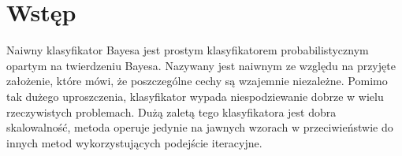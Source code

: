 \section{Wstęp}

Naiwny klasyfikator Bayesa jest prostym klasyfikatorem probabilistycznym opartym na twierdzeniu Bayesa. Nazywany jest naiwnym ze względu na przyjęte założenie, które mówi, że poszczególne cechy są wzajemnie niezależne. Pomimo tak dużego uproszczenia, klasyfikator wypada niespodziewanie dobrze w wielu rzeczywistych problemach. Dużą zaletą tego klasyfikatora jest dobra skalowalność, metoda operuje jedynie na jawnych wzorach w przeciwieństwie do innych metod wykorzystujących podejście iteracyjne.